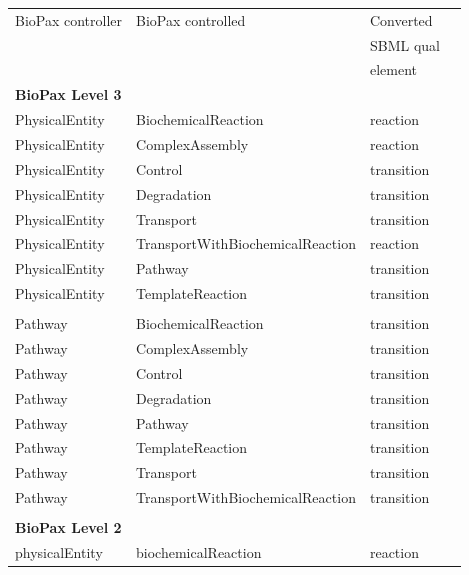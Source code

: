 \documentclass{bioinfo}
\begin{document}
\begin{methods}
\begin{table}[!t]
{\begin{tabular}{llll}\toprule
BioPax controller & BioPax controlled               & Converted\\
                  &                                 & SBML qual\\
                  &                                 & element\\
\midrule
\textbf{BioPax Level 3}\\
\midrule
PhysicalEntity & BiochemicalReaction                & reaction\\
PhysicalEntity & ComplexAssembly                    & reaction\\
PhysicalEntity & Control                            & transition\\
PhysicalEntity & Degradation                        & transition\\
PhysicalEntity & Transport                          & transition\\
PhysicalEntity & TransportWithBiochemicalReaction   & reaction\\
PhysicalEntity & Pathway                            & transition\\
PhysicalEntity & TemplateReaction                   & transition\\
\\
Pathway         & BiochemicalReaction               & transition\\
Pathway         & ComplexAssembly                   & transition\\
Pathway         & Control                           & transition\\
Pathway         & Degradation                       & transition\\
Pathway         & Pathway                           & transition\\
Pathway         & TemplateReaction                  & transition\\
Pathway         & Transport                         & transition\\
Pathway         & TransportWithBiochemicalReaction  & transition\\
\\\midrule
\textbf{BioPax Level 2}\\
\midrule
physicalEntity & biochemicalReaction                & reaction\\

\end{tabular}}
\end{table}
\end{methods}
\end{document}
